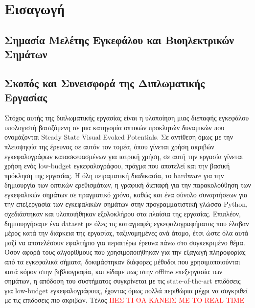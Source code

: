 \documentclass[11pt,a4paper,english,greek,twoside]{../Thesis}
\begin{document}
\chapter{Εισαγωγή}
\section{Σημασία Μελέτης Εγκεφάλου και Βιοηλεκτρικών Σημάτων}
\section{Σκοπός και Συνεισφορά της Διπλωματικής Εργασίας}
Στόχος αυτής της διπλωματικής εργασίας είναι η υλοποίηση μιας διεπαφής εγκεφάλου υπολογιστή βασιζόμενη σε μια κατηγορία οπτικών προκλητών δυναμικών που ονομάζονται Steady State Visual Evoked Potentials. Σε αντίθεση όμως με την πλειοψηφία της έρευνας σε αυτόν τον τομέα, όπου γίνεται χρήση ακριβών εγκεφαλογράφων κατασκευασμένων για ιατρική χρήση, σε αυτή την εργασία γίνεται χρήση ενός low-budget εγκεφαλογράφου, πράγμα που αποτελεί και την βασική πρόκληση της εργασίας. Η όλη πειραματική διαδικασία, το hardware για την δημιουργία των οπτικών ερεθισμάτων, η γραφική διεπαφή για την παρακολούθηση των εγκεφαλικών σημάτων σε πραγματικό χρόνο, καθώς και ένα σύνολο συναρτήσεων για την επεξεργασία των εγκεφαλικών σημάτων στην προγραμματιστική γλώσσα Python, σχεδιάστηκαν και υλοποιήθηκαν εξολοκλήρου στα πλαίσια της εργασίας. Επιπλέον, δημιουργήσαμε ένα dataset με όλες τις καταγραφές εγκεφαλογραφήματος που έλαβαν μέρος κατά την διάρκεια της εργασίας, ταξινομημένες ανά άτομο, έτσι ώστε όλα αυτά μαζί να αποτελέσουν εφαλτήριο για περαιτέρω έρευνα πάνω στο συγκεκριμένο θέμα. Όσον αφορά τους αλγορίθμους που χρησιμοποιήθηκαν για την εξαγωγή πληροφορίας από τα εγκεφαλικά σήματα, δοκιμάστηκαν διάφορες μέθοδοι που χρησιμοποιούνται κατά κόρον στην βιβλιογραφία, και είδαμε πως στην offline επεξεργασία των σημάτων, η απόδοση του συστήματος συγκρίνεται με τις state-of-the-art επιδόσεις για low-budget εγκεφαλογράφους, έχοντας όμως πολλά περιθώρια μέχρι να συγκριθεί με τις επιδόσεις πιο ακριβών. Τέλος \textcolor{red}{ΠΕΣ ΤΙ ΘΑ ΚΑΝΕΙΣ ΜΕ ΤΟ REAL TIME}
\end{document}
